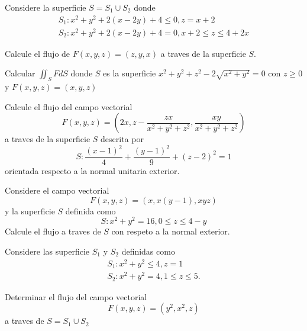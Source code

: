 \documentclass{article}
\begin{document}
\begin{problem}
  Considere la superficie $S = S_{1} \cup S_{2}$ donde
  \begin{gather*}
    S_{1} : x^{2} + y^{2} + 2(x - 2y) + 4 \leq 0, z = x + 2\\
    S_{2} : x^{2} + y^{2} + 2(x - 2y) + 4 = 0, x + 2 \leq z \leq 4 + 2x
  \end{gather*}

  Calcule el flujo de $F(x, y, z) = (z, y, x)$ a traves de la superficie $S$.
\end{problem}

\begin{problem}
  Calcular $\iint_{S} F dS$ donde $S$ es la superficie $x^{2} + y^{2} + z^{2} - 2\sqrt{x^{2} + y^{2}} = 0$ con $z \geq 0$ y $F(x, y, z) = (x, y, z)$
\end{problem}

\begin{problem}
  Calcule el flujo del campo vectorial \begin{equation*} F(x, y, z) = (2x, z - \frac{zx}{x^{2} + y^{2} + z^{2}}, \frac{xy}{x^{2} + y^{2} + z^{2}})\end{equation*} a traves de la superficie $S$ descrita por
  \begin{equation*}
    S: \frac{(x - 1)^{2}}{4} + \frac{(y - 1)^{2}}{9} + (z - 2)^{2} = 1
  \end{equation*}
  orientada respecto a la normal unitaria exterior.
\end{problem}

\begin{problem}
  Considere el campo vectorial
  \begin{equation*}
    F(x, y, z) = (x, x(y - 1), xyz)
  \end{equation*}
  y la superficie $S$ definida como
  \begin{equation*}
    S: x^{2} + y^{2}  = 16, 0 \leq z \leq 4 - y
  \end{equation*}
  Calcule el flujo a traves de $S$ con respeto a la normal exterior.
\end{problem}

\begin{problem}
  Considere las superficie $S_{1}$ y $S_{2}$ definidas como
  \begin{gather*}
    S_{1}: x^{2} + y^{2} \leq 4, z = 1\\
    S_{2}: x^{2} + y^{2} = 4, 1 \leq z \leq 5.
  \end{gather*}

  Determinar el flujo del campo vectorial
  \begin{equation*}
    F(x, y, z) = (y^{2}, x^{2}, z)
  \end{equation*}
  a traves de $S = S_{1} \cup S_{2}$
\end{problem}
\end{document}

